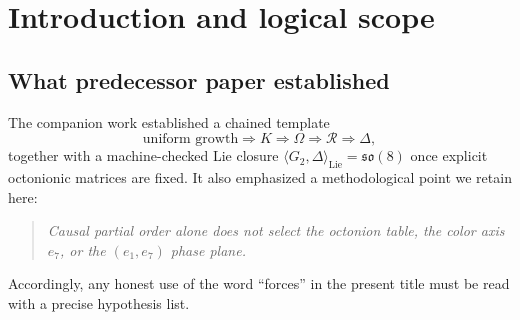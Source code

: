 \documentclass[11pt]{amsart}
\begin{document}
\begin{abstract}
We further record a \emph{no-intermediate-knobs} discipline \emph{inside} the growth stack: causal overlap geometry is taken as logically prior to informational monogamy, while Brodie \cite{brodie2026} supplies the thermodynamic route from that monogamy picture to the imprint normalization \(\alpha=3/5\). Concretely, the monogamy coefficient is not a second continuous fit parameter but the complement \(\gamma:=1-\alpha\) on the unit horizon split ( in ), and the lattice-derived imprint ratio built from the same cumulative simplex ledger agrees with \(\alpha\) at every shell (). The pair \((\alpha,\gamma)=(3/5,2/5)\) is then the \emph{direct} consequence of that single-causation bookkeeping together with the HQIV normalization and rational arithmetic---not an independent ``Diophantine coincidence'' layered on top. (Lean proves the split and the coherence; the thermodynamic/lattice-dimension narrative for why \(\alpha=3/5\) in nature is in the companion manuscript and repository comments; deriving the same fractions from an \emph{arbitrary} growth law is left as a program, not a claim here.) The \(\mathfrak{so}(8)\) closure stack also admits an exact rational structure-constant certificate. An \emph{audit graph} of named intermediates is posited so that no off-ledger translation steps interpolate between discrete growth and octonionic gauge data; imaginary octonion directions appear as genuine skew-adjoint operators on the shared \(\mathbb{R}^8\) carrier.

Turning this package into a \emph{single} implication from causal-set axioms alone, with no imported Lie seed, remains conjectural and is stated as such.
\end{abstract}
\maketitle



\section{Introduction and logical scope}

\subsection{What predecessor paper established}

The companion work \cite{hqiv-so8-paper} established a chained template
\[
\text{uniform growth}\Longrightarrow K\Longrightarrow \Omega\Longrightarrow \mathcal{R}
\Longrightarrow \Delta,
\]
together with a machine-checked Lie closure \(\langle G_2,\Delta\rangle_{\mathrm{Lie}}=\mathfrak{so}(8)\) once explicit octonionic matrices are fixed. It also emphasized a methodological point we retain here:
\begin{quote}
\emph{Causal partial order alone does not select the octonion table, the color axis \(e_7\), or the \((e_1,e_7)\) phase plane.}
\end{quote}
Accordingly, any honest use of the word ``forces'' in the present title must be read with a precise hypothesis list.
\end{document}
